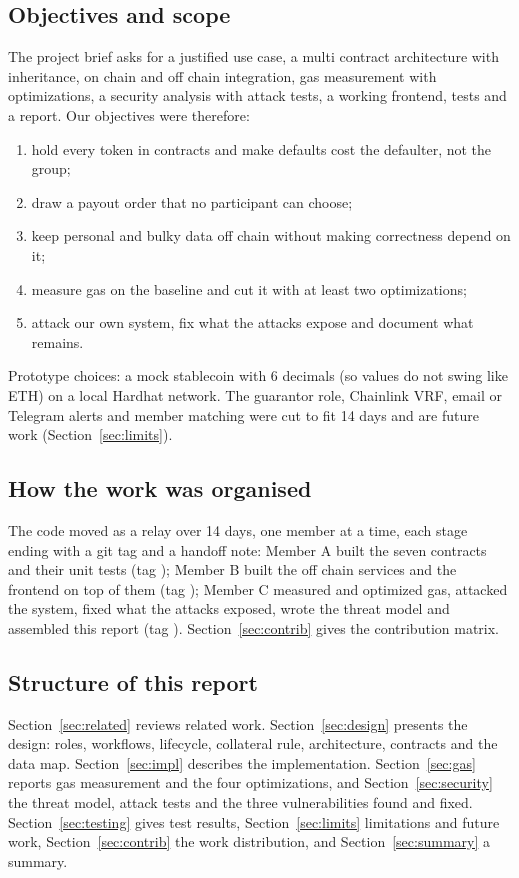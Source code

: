 \subsection{Objectives and scope}
The project brief \cite{brief} asks for a justified use case, a multi contract architecture with inheritance,
on chain and off chain integration, gas measurement with optimizations, a security analysis with
attack tests, a working frontend, tests and a report. Our objectives were therefore:
\begin{enumerate}
  \item hold every token in contracts and make defaults cost the defaulter, not the group;
  \item draw a payout order that no participant can choose;
  \item keep personal and bulky data off chain without making correctness depend on it;
  \item measure gas on the baseline and cut it with at least two optimizations;
  \item attack our own system, fix what the attacks expose and document what remains.
\end{enumerate}
Prototype choices: a mock stablecoin with 6 decimals (so values do not swing like ETH) on a local
Hardhat network. The guarantor role, Chainlink VRF, email or Telegram alerts and member matching
were cut to fit 14 days and are future work (Section~\ref{sec:limits}).

\subsection{How the work was organised}
The code moved as a relay over 14 days, one member at a time, each stage ending with a git tag and a
handoff note: Member A built the seven contracts and their unit tests (tag );
Member B built the off chain services and the frontend on top of them (tag );
Member C measured and optimized gas, attacked the system, fixed what the attacks exposed, wrote the
threat model and assembled this report (tag ). Section~\ref{sec:contrib} gives the
contribution matrix.

\subsection{Structure of this report}
Section~\ref{sec:related} reviews related work. Section~\ref{sec:design} presents the design:
roles, workflows, lifecycle, collateral rule, architecture, contracts and the data map.
Section~\ref{sec:impl} describes the implementation. Section~\ref{sec:gas} reports gas measurement
and the four optimizations, and Section~\ref{sec:security} the threat model, attack tests and the
three vulnerabilities found and fixed. Section~\ref{sec:testing} gives test results,
Section~\ref{sec:limits} limitations and future work, Section~\ref{sec:contrib} the work
distribution, and Section~\ref{sec:summary} a summary.
